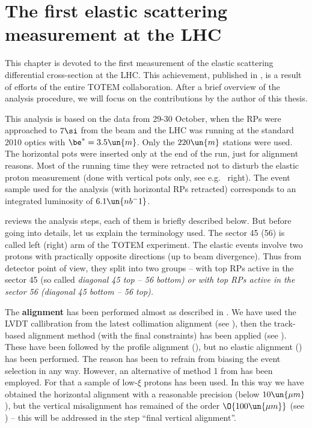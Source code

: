 \iffalse
DPE, SD, MC
\fi

\chapter[felm]{The first elastic scattering measurement at the LHC}

This chapter is devoted to the first measurement of the elastic scattering differential cross-section at the LHC. This achievement, published in , is a result of efforts of the entire TOTEM collaboration. After a brief overview of the analysis procedure, we will focus on the contributions by the author of this thesis.

This analysis is based on the data from 29-30 October, when the RPs were approached to $7\si$ from the beam and the LHC was running at the standard 2010 optics with $\be^* = 3.5\un{m}$. Only the $220\un{m}$ stations were used. The horizontal pots were inserted only at the end of the run, just for alignment reasons. Most of the running time they were retracted not to disturb the elastic proton measurement (done with vertical pots only, see e.g.~ right). The event sample used for the analysis (with horizontal RPs retracted) corresponds to an integrated luminosity of $6.1\un{nb^-1}$.


 reviews the analysis steps, each of them is briefly described below. But before going into details, let us explain the terminology used. The sector 45 (56) is called left (right) arm of the TOTEM experiment. The elastic events involve two protons with practically opposite directions (up to beam divergence). Thus from detector point of view, they split into two groups -- with top RPs active in the sector 45 (so called \em{diagonal} 45 top -- 56 bottom) or with top RPs active in the sector 56 (diagonal 45 bottom -- 56 top).

\> The {\bf alignment} has been performed almost as described in . We have used the LVDT callibration from the latest collimation alignment (see ), then the track-based alignment method (with the final constraints) has been applied (see ). These have been followed by the profile alignment (), but no elastic alignment () has  been performed. The reason has been to refrain from biasing the event selection in any way. However, an alternative of method 1 from  has been employed. For that a sample of low-$\xi$ protons has been used. In this way we have obtained the horizontal alignment with a reasonable precision (below $10\un{\mu m}$), but the vertical misalignment has remained of the order $\O{100\un{\mu m}}$ (see ) -- this will be addressed in the step ``final vertical alignment''.

